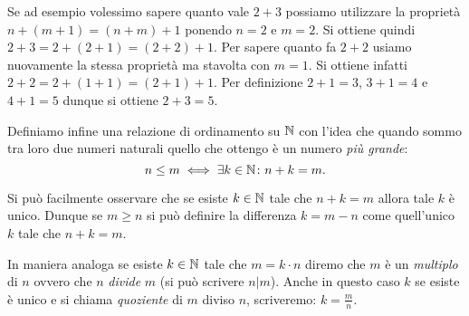 Se ad esempio volessimo sapere quanto vale $2+3$ possiamo utilizzare 
la proprietà $n+(m+1) = (n+m)+1$ ponendo $n=2$ e $m=2$.
Si ottiene quindi $2+3 = 2+(2+1) = (2+2)+1$.
Per sapere quanto fa $2+2$ usiamo nuovamente la stessa proprietà 
ma stavolta con $m=1$. 
Si ottiene infatti $2+2=2+(1+1)=(2+1)+1$.
Per definizione $2+1=3$, $3+1=4$ e $4+1=5$ dunque si ottiene $2+3=5$.

Definiamo infine una relazione di ordinamento su ${\mathbb N}$ 
con l'idea che quando sommo tra loro due numeri naturali 
quello che ottengo è un numero \emph{più grande}:
%
\[
   n\le m \iff \exists k\in {\mathbb N} \colon n+k = m.
\]

Si può facilmente osservare che se esiste $k\in {\mathbb N}$ tale che $n+k=m$
allora tale $k$ è unico. 
Dunque se $m\ge n$ si può definire la differenza $k=m-n$
come quell'unico $k$ tale che $n+k=m$.

In maniera analoga se esiste $k\in {\mathbb N}$ tale che $m=k\cdot n$
diremo che $m$ è un \emph{multiplo} di $n$ 
%
ovvero che $n$ \emph{divide} $m$ (si può scrivere $n\vert m$).
Anche in questo caso $k$ se esiste è unico e si 
chiama \emph{quoziente} di $m$ diviso $n$, 
%
scriveremo: $k=\frac m n$.

